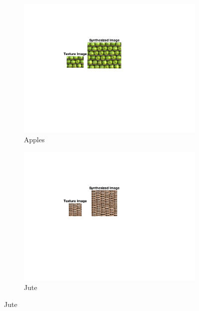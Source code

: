 \documentclass[10pt,twocolumn,letterpaper]{article}
\begin{document}
\begin{figure}
     \centering
     \begin{subfigure}[h]{0.33\textwidth}
         \centering
         \includegraphics[trim={4.5cm 7cm 8.0cm 3cm}, clip, scale=1.5, width=\textwidth]{../results/syn_final/result_apples_c_B_40.png}
         \caption{Apples}
         \label{fig:apples_res}
     \end{subfigure}
     \hfill
     \begin{subfigure}[h]{0.33\textwidth}
        \centering
        \includegraphics[trim={4.5cm 7cm 8.0cm 3cm}, clip, scale=1.5, width=\textwidth]{../results/syn_final/result_jute_c_B_40.png}
        \caption{Jute}
        \label{fig:jute_res}
    \end{subfigure}

\end{figure}
\end{document}

